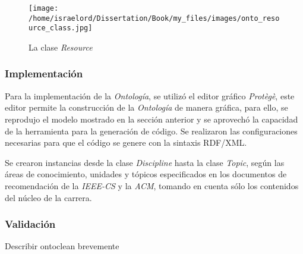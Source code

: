 \newpage
\begin{figure}[!h]
    \begin{center}
        \texttt{[image: /home/israelord/Dissertation/Book/my\_files/images/onto\_resource\_class.jpg]}
        \caption{La clase \textit{Resource}}
        \label{resourceClass}
    \end{center}
\end{figure}


\subsubsection{Implementación}
Para la implementación de la \textit{Ontología}, se utilizó el editor gráfico \textit{Protègè}, este editor permite la construcción de la \textit{Ontología} de manera gráfica, para ello, se reprodujo el modelo mostrado en la sección anterior y se aprovechó la capacidad de la herramienta para la generación de código. Se realizaron las configuraciones necesarias para que el código se genere con la sintaxis RDF/XML.

Se crearon instancias desde la clase \textit{Discipline} hasta la clase \textit{Topic}, según las áreas de conocimiento, unidades y tópicos especificados en los documentos de recomendación de la \textit{IEEE-CS} y la \textit{ACM}, tomando en cuenta sólo los contenidos del núcleo de la carrera.

\subsubsection{Validación}
Describir ontoclean brevemente

\newpage
